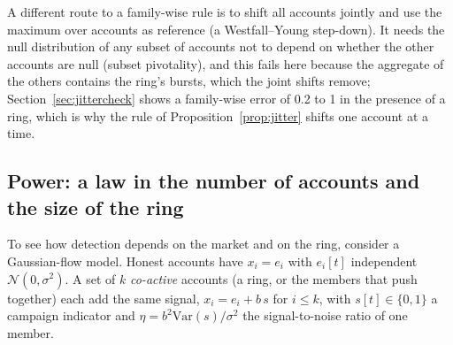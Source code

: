A different route to a family-wise rule is to shift all accounts jointly and use the maximum over accounts as reference (a Westfall--Young step-down). It needs the null distribution of any subset of accounts not to depend on whether the other accounts are null (subset pivotality), and this fails here because the aggregate of the others contains the ring's bursts, which the joint shifts remove; Section~\ref{sec:jittercheck} shows a family-wise error of 0.2 to 1 in the presence of a ring, which is why the rule of Proposition~\ref{prop:jitter} shifts one account at a time.

\subsection{Power: a law in the number of accounts and the size of the ring}\label{sec:power}

To see how detection depends on the market and on the ring, consider a Gaussian-flow model. Honest accounts have $x_i=e_i$ with $e_i[t]$ independent $\mathcal N(0,\sigma^2)$. A set of $k$ \emph{co-active} accounts (a ring, or the members that push together) each add the same signal, $x_i=e_i+b\,s$ for $i\le k$, with $s[t]\in\{0,1\}$ a campaign indicator and $\eta=b^2\mathrm{Var}(s)/\sigma^2$ the signal-to-noise ratio of one member.

